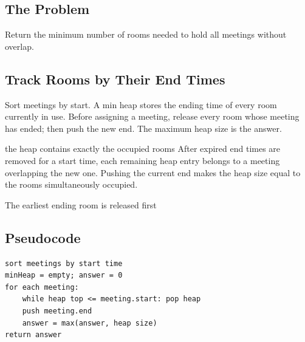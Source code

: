 \subsection{The Problem}
Return the minimum number of rooms needed to hold all meetings without
overlap.

\subsection{Track Rooms by Their End Times}
Sort meetings by start. A min heap stores the ending time of every room
currently in use. Before assigning a meeting, release every room whose meeting
has ended; then push the new end. The maximum heap size is the answer.

\begin{invariantbox}{the heap contains exactly the occupied rooms}
After expired end times are removed for a start time, each remaining heap
entry belongs to a meeting overlapping the new one. Pushing the current end
makes the heap size equal to the rooms simultaneously occupied.
\end{invariantbox}

\begin{visualbox}{The earliest ending room is released first}
\centering
{}
\end{visualbox}

\subsection{Pseudocode}
\begin{lstlisting}[style=pseudocode]
sort meetings by start time
minHeap = empty; answer = 0
for each meeting:
    while heap top <= meeting.start: pop heap
    push meeting.end
    answer = max(answer, heap size)
return answer
\end{lstlisting}

